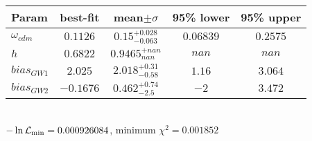 \begin{tabular}{|l|c|c|c|c|} 
 \hline 
Param & best-fit & mean$\pm\sigma$ & 95\% lower & 95\% upper \\ \hline 
$\omega_{cdm }$ &$0.1126$ & $0.15_{-0.063}^{+0.028}$ & $0.06839$ & $0.2575$ \\ 
$h$ &$0.6822$ & $0.9465_{nan}^{+nan}$ & $nan$ & $nan$ \\ 
$bias_{GW 1 }$ &$2.025$ & $2.018_{-0.58}^{+0.31}$ & $1.16$ & $3.064$ \\ 
$bias_{GW 2 }$ &$-0.1676$ & $0.462_{-2.5}^{+0.74}$ & $-2$ & $3.472$ \\ 
\hline 
 \end{tabular} \\ 
$-\ln{\cal L}_\mathrm{min} =0.000926084$, minimum $\chi^2=0.001852$ \\ 
